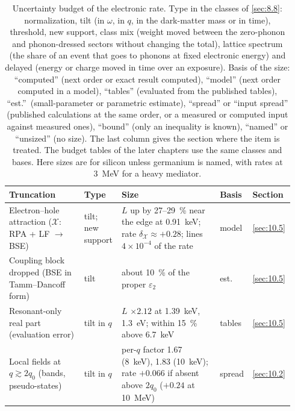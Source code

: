 \begin{table}[tbp]
  \caption{Uncertainty budget of the electronic rate. Type in the classes of \cref{sec:8.8}: normalization, tilt (in $\omega$, in $q$, in the dark-matter mass or in time), threshold, new support, class mix (weight moved between the zero-phonon and phonon-dressed sectors without changing the total), lattice spectrum (the share of an event that goes to phonons at fixed electronic energy) and delayed (energy or charge moved in time over an exposure). Basis of the size: ``computed'' (next order or exact result computed), ``model'' (next order computed in a model), ``tables'' (evaluated from the published tables), ``est.''\ (small-parameter or parametric estimate), ``spread'' or ``input spread'' (published calculations at the same order, or a measured or computed input against measured ones), ``bound'' (only an inequality is known), ``named'' or ``unsized'' (no size). The last column gives the section where the item is treated. The budget tables of the later chapters use the same classes and bases. Here sizes are for silicon unless germanium is named, with rates at \SI{3}{MeV} for a heavy mediator.}
  \label{tab:10-nuisances}
  \centering\footnotesize\setlength{\tabcolsep}{3pt}
  \begin{tabular}{@{}>{\raggedright\arraybackslash}p{0.26\linewidth}>{\raggedright\arraybackslash}p{0.13\linewidth}>{\raggedright\arraybackslash}p{0.34\linewidth}>{\raggedright\arraybackslash}p{0.09\linewidth}>{\raggedright\arraybackslash}p{0.12\linewidth}@{}}
    \toprule
    Truncation & Type & Size & Basis & Section \\
    \midrule
    Electron--hole attraction ($\mathcal{X}$: RPA + LF $\to$ BSE) & tilt; new support & $L$ up by 27--\SI{29}{\percent} near the edge at \SI{0.91}{keV}; rate $\delta_{\mathcal{X}} \approx +0.28$; lines $4\times10^{-4}$ of the rate & model & \cref{sec:10.5} \\
    Coupling block dropped (BSE in Tamm--Dancoff form) & tilt & about \SI{10}{\percent} of the proper $\varepsilon_2$ & est. & \cref{sec:10.5} \\
    Resonant-only real part (evaluation error) & tilt in $q$ & $L$ $\times2.12$ at \SI{1.39}{keV}, \SI{1.3}{eV}; within \SI{15}{\percent} above \SI{6.7}{keV} & tables & \cref{sec:10.5} \\
    Local fields at $q \gtrsim 2q_0$ (bands, pseudo-states) & tilt in $q$ & per-$q$ factor 1.67 (\SI{8}{keV}), 1.83 (\SI{10}{keV}); rate $+0.066$ if absent above $2q_0$ ($+0.24$ at \SI{10}{MeV}) & spread & \cref{sec:10.2} \\

\end{tabular}
\end{table}
